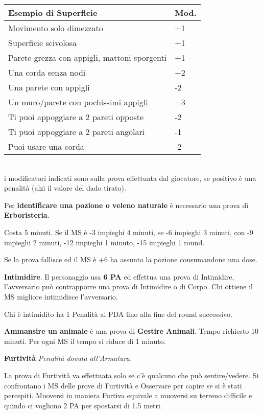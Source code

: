 \documentclass[12pt,a4paper,twoside,openany]{book}
\begin{document}
\begin{multicols}{2}
\begin{tabularx}{0.45\textwidth}{Xl}
	\textbf{Esempio di Superficie} & Mod.\\
	\toprule
	Movimento solo dimezzato & +1\\
	Superficie scivolosa&+1\\
	Parete grezza con appigli, mattoni sporgenti&+1\\
	Una corda senza nodi&+2\\
	Una parete con appigli &-2\\
	Un muro/parete con pochissimi appigli&+3\\
	Ti puoi appoggiare a 2 pareti opposte&-2\\
	Ti puoi appoggiare a 2 pareti angolari&-1\\
	Puoi usare una corda&-2\\
\end{tabularx}\\

i modificatori indicati sono sulla prova effettuata dal giocatore, se positivo è una penalità (alzi il valore del dado tirato).

\medskip

Per \textbf{identificare una pozione o veleno naturale} è necessario una prova di \textbf{Erboristeria}.

Costa 5 minuti. Se il MS è -3 impieghi 4 minuti, se -6 impieghi 3 minuti, con -9 impieghi 2 minuti, -12 impieghi 1 minuto, -15 impieghi 1 round.

Se la prova fallisce ed il MS è +6 ha assunto la pozione consumandone una dose.

\medskip

\textbf{Intimidire}. Il personaggio usa \textbf{6 PA} ed effettua una prova di Intimidire, l'avversario può contrapporre una prova di Intimidire o di Corpo. Chi ottiene il MS migliore intimidisce l'avversario.

Chi è intimidito ha 1 Penalità al PDA fino alla fine del round successivo.

\medskip

\textbf{Ammansire un animale} è una prova di \textbf{Gestire Animali}. Tempo richiesto 10 minuti. Per ogni MS il tempo si riduce di 1 minuto.

\medskip

\textbf{Furtività}  \textit{Penalità dovuta all'Armatura.}

La prova di Furtività va effettuata solo se c'è qualcuno che può sentire/vedere. Si confrontano i MS delle prove di Furtività e Osservare per capire se si è stati percepiti. Muoversi in maniera Furtiva equivale a muoversi su terreno difficile e quindo ci vogliono 2 PA per spostarsi di 1.5 metri.


\end{multicols}
\end{document}
